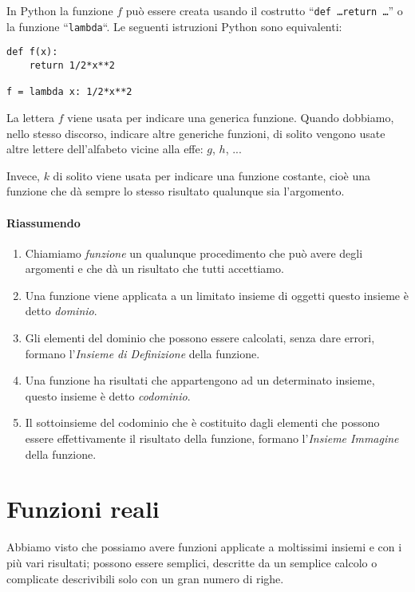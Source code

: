 In Python la funzione $f$ può essere creata usando il costrutto 
``\texttt{def \dots return \dots}'' o la funzione ``\texttt{lambda}``.
Le seguenti istruzioni Python sono equivalenti:

\begin{lstlisting}
def f(x):
    return 1/2*x**2

f = lambda x: 1/2*x**2
\end{lstlisting}

\begin{osservazione}
La lettera $f$ viene usata per indicare una generica funzione. 
Quando dobbiamo, nello stesso discorso, indicare altre generiche funzioni, 
di solito vengono usate altre lettere dell'alfabeto vicine alla effe: $g$, 
$h$, ...

Invece, $k$ di solito viene usata per indicare una funzione costante, cioè 
una funzione che dà sempre lo stesso risultato qualunque sia l'argomento.
\end{osservazione}

\paragraph{Riassumendo}

\begin{enumerate} [noitemsep]
\item Chiamiamo \emph{funzione} un qualunque procedimento che può avere 
degli argomenti e che dà un risultato che tutti accettiamo.
\item Una funzione viene applicata a un limitato insieme di oggetti questo 
insieme è detto \emph{dominio}.
\item Gli elementi del dominio che possono essere calcolati, senza dare 
errori, formano l'\emph{Insieme di Definizione} della funzione.
\item Una funzione ha risultati che appartengono ad un determinato insieme, 
questo insieme è detto \emph{codominio}.
\item Il sottoinsieme del codominio che è costituito dagli elementi che 
possono essere effettivamente il risultato della funzione, formano 
l'\emph{Insieme Immagine} della funzione.
\end{enumerate}

\section{Funzioni reali}
\label{sec:funzioni2_reali}

Abbiamo visto che possiamo avere funzioni applicate a moltissimi insiemi e 
con i più vari risultati; possono essere semplici, descritte da un semplice 
calcolo o complicate descrivibili solo con un gran numero di righe.

